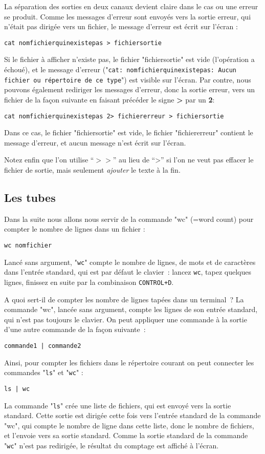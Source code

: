 \documentclass[12pt,a4paper]{article}
\begin{document}
La séparation des sorties en deux
canaux devient claire dans le cas ou une erreur se produit. Comme
les messages d'erreur sont envoyés vers la sortie erreur, qui n'était
pas dirigée vers un fichier, le message d'erreur est écrit sur
l'écran : 
\begin{verbatim}
cat nomfichierquinexistepas > fichiersortie
\end{verbatim}
Si le fichier à afficher n'existe pas, le fichier "fichiersortie" est vide
(l'opération a échoué), et le message d'erreur ("\texttt{cat:
  nomfichierquinexistepas: Aucun fichier ou répertoire de ce type}")
est visible sur l'écran. Par contre, nous pouvons également
rediriger les messages d'erreur, donc la sortie erreur, vers un
fichier de la façon suivante en faisant précéder le signe \textbf{>}
par un \textbf{2}: 
\begin{verbatim}
cat nomfichierquinexistepas 2> fichiererreur > fichiersortie
\end{verbatim}
Dans ce cas, le fichier "fichiersortie" est vide, le fichier
"fichiererreur" contient le message d'erreur, et
aucun message n'est écrit sur l'écran.

Notez enfin que l'on utilise ``\textbf{$>>$}'' au lieu de ``>'' si l'on
ne veut pas effacer le fichier de sortie, mais seulement
\textit{ajouter} le texte à la fin.


\subsection{Les tubes}

Dans la suite nous allons nous servir de la commande "wc" (=word
count) pour compter le nombre de lignes dans un fichier : 
\begin{verbatim}
wc nomfichier
\end{verbatim}
Lancé sans argument, "\texttt{wc}" compte le nombre de lignes, de mots
et de caractères dans l'entrée standard, qui est par défaut le
clavier~: lancez \texttt{wc}, tapez
quelques lignes, finissez en suite par la combinaison
\texttt{CONTROL+D}. 

A quoi sert-il de compter les nombre
de lignes tapées dans un terminal~? La commande "wc", lancée sans
argument, compte les lignes de son entrée standard, qui n'est pas
toujours le clavier. On peut appliquer une commande à la sortie d'une
autre commande de la façon suivante~: 
\begin{verbatim}
commande1 | commande2
\end{verbatim}
Ainsi,
pour compter les fichiers dans le répertoire courant on peut connecter les
commandes "\texttt{ls}" et "\texttt{wc}" : 
\begin{verbatim}
ls | wc
\end{verbatim}
La commande "\texttt{ls}" crée une liste de
fichiers, qui est envoyé vers la sortie standard. Cette sortie est
dirigée cette fois vers l'entrée standard de la commande "wc", qui
compte le nombre de 
ligne dans cette liste, donc le nombre de fichiers, et l'envoie vers
sa sortie standard. Comme la sortie standard de la commande "\texttt{wc}" n'est
pas redirigée, le résultat du comptage est affiché à l'écran.
\end{document}
